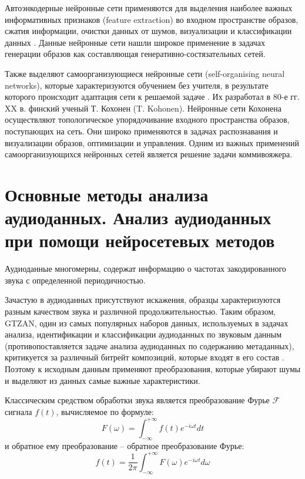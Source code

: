 Автоэнкодерные нейронные сети применяются для выделения наиболее важных информативных признаков 
(feature extraction) во входном пространстве образов, сжатия информации, очистки
данных от шумов, визуализации и классификации данных \cite{bgu_krasn}.
Данные нейронные сети нашли широкое применение в задачах генерации образов как составляющая генеративно-состязательных сетей.

Также выделяют самоорганизующиеся нейронные сети (self-organising neural networks), которые характеризуются обучением без учителя, в результате которого происходит адаптация сети к решаемой задаче . Их разработал в 80-е гг. XX в.
финский ученый Т. Кохонен (T. Kohonen). Нейронные сети
Кохонена осуществляют топологическое упорядочивание входного
пространства образов, поступающих на сеть. Они широко применяются
в задачах распознавания и визуализации образов, оптимизации и
управления. Одним из важных применений самоорганизующихся нейронных сетей является решение задачи коммивояжера.

\chapter{Основные методы анализа аудиоданных. Анализ аудиоданных при помощи нейросетевых методов}
Аудиоданные многомерны, содержат информацию о частотах закодированного звука с 
определенной периодичностью. 

Зачастую в аудиоданных присутствуют искажения, образцы характеризуются разным качеством звука и различной продолжительностью. 
Таким образом, GTZAN, один из самых популярных наборов данных, используемых в задачах анализа, идентификации и классификации аудиоданных по
звуковым данным (противопоставляется задаче анализа аудиоданных по содержанию метаданных), критикуется за различный битрейт композиций, которые входят в его состав \cite{gtzan}.
Поэтому к исходным данным применяют преобразования, которые убирают шумы и выделяют из данных самые важные характеристики.

Классическим средством обработки звука является преобразование Фурье $\mathcal{F}$ сигнала $f(t)$, вычисляемое по формуле:
\begin{equation} \label{eq:ft}
	F(\omega) = \int_{-\infty}^{+\infty} f(t) e ^ {-i \omega t} dt
\end{equation} и обратное ему преобразование -- обратное преобразование Фурье:
\begin{equation}
	f(t) = \frac{1}{2\pi} \int_{-\infty}^{+\infty} F(\omega) e^{-i \omega t} d\omega
\end{equation}

